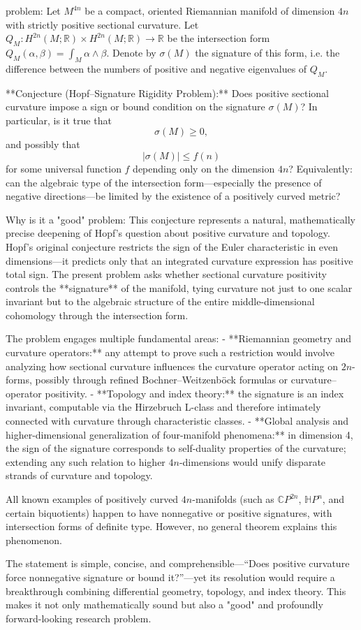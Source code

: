 problem:  
Let \( M^{4n} \) be a compact, oriented Riemannian manifold of dimension \(4n\) with strictly positive sectional curvature.  
Let \( Q_M \colon H^{2n}(M;\mathbb{R}) \times H^{2n}(M;\mathbb{R}) \to \mathbb{R} \) be the intersection form \( Q_M(\alpha,\beta) = \int_M \alpha \wedge \beta. \)  
Denote by \( \sigma(M) \) the signature of this form, i.e. the difference between the numbers of positive and negative eigenvalues of \( Q_M \).

**Conjecture (Hopf–Signature Rigidity Problem):**  
Does positive sectional curvature impose a sign or bound condition on the signature \( \sigma(M) \)? In particular, is it true that
\[
\sigma(M) \ge 0,
\]
and possibly that
\[
|\sigma(M)| \le f(n)
\]
for some universal function \( f \) depending only on the dimension \(4n\)?  
Equivalently: can the algebraic type of the intersection form—especially the presence of negative directions—be limited by the existence of a positively curved metric?

Why is it a "good" problem:  
This conjecture represents a natural, mathematically precise deepening of Hopf’s question about positive curvature and topology. Hopf’s original conjecture restricts the sign of the Euler characteristic in even dimensions—it predicts only that an integrated curvature expression has positive total sign. The present problem asks whether sectional curvature positivity controls the **signature** of the manifold, tying curvature not just to one scalar invariant but to the algebraic structure of the entire middle-dimensional cohomology through the intersection form.

The problem engages multiple fundamental areas:
- **Riemannian geometry and curvature operators:** any attempt to prove such a restriction would involve analyzing how sectional curvature influences the curvature operator acting on \(2n\)-forms, possibly through refined Bochner–Weitzenböck formulas or curvature–operator positivity.
- **Topology and index theory:** the signature is an index invariant, computable via the Hirzebruch L-class and therefore intimately connected with curvature through characteristic classes.
- **Global analysis and higher-dimensional generalization of four-manifold phenomena:** in dimension 4, the sign of the signature corresponds to self-duality properties of the curvature; extending any such relation to higher \(4n\)-dimensions would unify disparate strands of curvature and topology.

All known examples of positively curved \(4n\)-manifolds (such as \( \mathbb{C}P^{2n} \), \( \mathbb{H}P^n \), and certain biquotients) happen to have nonnegative or positive signatures, with intersection forms of definite type. However, no general theorem explains this phenomenon.

The statement is simple, concise, and comprehensible—“Does positive curvature force nonnegative signature or bound it?”—yet its resolution would require a breakthrough combining differential geometry, topology, and index theory. This makes it not only mathematically sound but also a "good" and profoundly forward-looking research problem.
